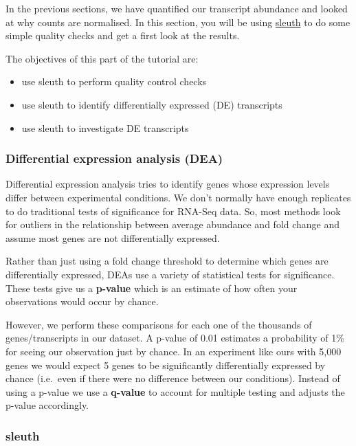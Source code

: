\documentclass[11pt]{article}
\providecommand{\tightlist}{%
      \setlength{\itemsep}{0pt}\setlength{\parskip}{0pt}}
\begin{document}
In the previous sections, we have quantified our transcript abundance
and looked at why counts are normalised. In this section, you will be
using \href{https://pachterlab.github.io/sleuth}{sleuth} to do some
simple quality checks and get a first look at the results.

The objectives of this part of the tutorial are:

\begin{itemize}
\tightlist
\item
  use sleuth to perform quality control checks
\item
  use sleuth to identify differentially expressed (DE) transcripts
\item
  use sleuth to investigate DE transcripts
\end{itemize}

\hypertarget{differential-expression-analysis-dea}{%
\subsubsection{Differential expression analysis
(DEA)}\label{differential-expression-analysis-dea}}

Differential expression analysis tries to identify genes whose
expression levels differ between experimental conditions. We don't
normally have enough replicates to do traditional tests of significance
for RNA-Seq data. So, most methods look for outliers in the relationship
between average abundance and fold change and assume most genes are not
differentially expressed.

Rather than just using a fold change threshold to determine which genes
are differentially expressed, DEAs use a variety of statistical tests
for significance. These tests give us a \textbf{p-value} which is an
estimate of how often your observations would occur by chance.

However, we perform these comparisons for each one of the thousands of
genes/transcripts in our dataset. A p-value of 0.01 estimates a
probability of 1\% for seeing our observation just by chance. In an
experiment like ours with 5,000 genes we would expect 5 genes to be
significantly differentially expressed by chance (i.e.~even if there
were no difference between our conditions). Instead of using a p-value
we use a \textbf{q-value} to account for multiple testing
and adjusts the p-value accordingly.

\hypertarget{sleuth}{%
\subsubsection{sleuth}\label{sleuth}}
\end{document}
